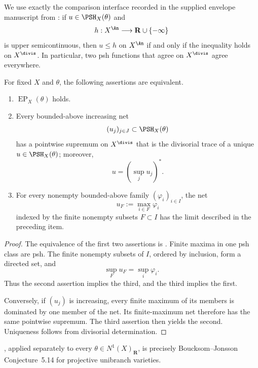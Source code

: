 We use exactly the comparison interface recorded in the supplied envelope
manuscript from \cite[Theorem~4.22]{BJ22}: if
$u\in\PSH_X(\theta)$ and
\[
              h:X^{\An}\longrightarrow\mathbf R\cup\{-\infty\}
\]
is upper semicontinuous, then $u\le h$ on $X^{\An}$ if and only if
the inequality holds on $X^{\divis}$.  In particular, two psh functions
that agree on $X^{\divis}$ agree everywhere.

\begin{proposition}\label{prop:bj-increasing-net-criterion}
\label{prop:bj-ep-equivalences}
For fixed $X$ and $\theta$, the following assertions are equivalent.
\begin{enumerate}
\item $\operatorname{EP}_X(\theta)$ holds.
\item Every bounded-above increasing net
\[
                  (u_j)_{j\in J}\subset\PSH_X(\theta)
\]
has a pointwise supremum on $X^{\divis}$ that is the divisorial trace of
a unique $u\in\PSH_X(\theta)$; moreover,
\[
                         u=\left(\sup_j u_j\right)^*.
\]
\item For every nonempty bounded-above family
$(\varphi_i)_{i\in I}$, the net
\[
                 u_F:=\max_{i\in F}\varphi_i
\tag{37.3}\label{eq:bj-finite-max-net}
\]
indexed by the finite nonempty subsets $F\subset I$ has the limit
described in the preceding item.
\end{enumerate}
\par
\end{proposition}

\begin{proof}
The equivalence of the first two assertions is
\cite[Theorem~5.11]{BJ22}.  Finite maxima in one psh class are psh.
The finite nonempty subsets of $I$, ordered by inclusion, form a directed
set, and
\[
                        \sup_F u_F=\sup_i\varphi_i.
\]
Thus the second assertion implies the third, and the third implies the
first.

Conversely, if $(u_j)$ is increasing, every finite maximum of its
members is dominated by one member of the net.  Its finite-maximum net
therefore has the same pointwise supremum.  The third assertion then yields
the second.  Uniqueness follows from divisorial determination.
\end{proof}

\begin{corollary}\label{cor:bj-historical-conjecture}
, applied separately to every
$\theta\in N^1(X)_{\mathbf R}$, is precisely Boucksom--Jonsson
Conjecture~5.14 for projective unibranch varieties.
\end{corollary}

